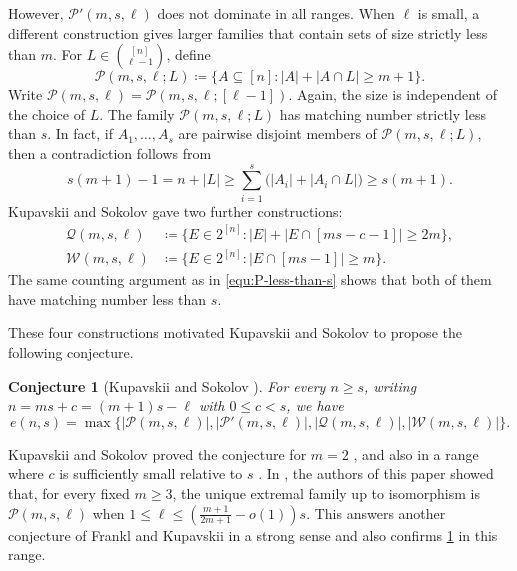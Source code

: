 \documentclass[10pt,a4paper]{article}
\numberwithin{equation}{section}
\newtheorem{conjecture}[conjecture]{Conjecture}
\theoremstyle{definition}
\begin{document}
However, $\mathcal P'(m,s,\ell)$ does not dominate in all ranges.
When $\ell$ is small, a different construction gives larger families that contain sets of size strictly less than $m$.
For $L\in\binom{[n]}{\ell-1}$, define
\[
        \mathcal P(m,s,\ell;L)
        \coloneqq
        \{A\subseteq[n]: |A|+|A\cap L|\ge m+1\}.
\]
Write $\mathcal P(m,s,\ell)=\mathcal P(m,s,\ell;[\ell-1])$.
Again, the size is independent of the choice of $L$.
The family $\mathcal P(m,s,\ell;L)$ has matching number strictly less than $s$.
In fact, if $A_1,\ldots,A_s$ are pairwise disjoint members of $\mathcal P(m,s,\ell;L)$, then a contradiction follows from
\begin{equation}\label{equ:P-less-than-s}
        s(m+1)-1=n+|L|
        \ge
        \sum_{i=1}^s \bigl(|A_i|+|A_i\cap L|\bigr)
        \ge s(m+1).
\end{equation}
Kupavskii and Sokolov gave two further constructions:
\[
        \begin{aligned}
                \mathcal Q(m,s,\ell)
                 & \coloneqq\{E\in 2^{[n]}\colon |E|+|E\cap[ms-c-1]|\ge2m\}, \\
                \mathcal W(m,s,\ell)
                 & \coloneqq\{E\in 2^{[n]}\colon |E\cap [ms-1]|\ge m\}.
        \end{aligned}
\]
The same counting argument as in \eqref{equ:P-less-than-s} shows that both of them have matching number less than $s$.

These four constructions motivated Kupavskii and Sokolov to propose the following conjecture.
\begin{conjecture}[Kupavskii and Sokolov \cite{KupavskiiSokolovOtherEnd}]\label{conj}
        For every $n\ge s$, writing $n=ms+c=(m+1)s-\ell$ with $0\le c<s$, we have
        \[
                e(n,s)=
                \max\{
                |\mathcal P(m,s,\ell)|,
                |\mathcal P'(m,s,\ell)|,
                |\mathcal Q(m,s,\ell)|,
                |\mathcal W(m,s,\ell)|
                \}.
        \]
\end{conjecture}
Kupavskii and Sokolov proved the conjecture for $m=2$ \cite{KupavskiiSokolov2025}, and also in a range where $c$ is sufficiently small relative to $s$ \cite{KupavskiiSokolovOtherEnd}.
In \cite{ChiWangK1}, the authors of this paper showed that, for every fixed $m\ge3$, the unique extremal family up to isomorphism is $\mathcal P(m,s,\ell)$ when $1\le \ell\le (\frac{m+1}{2m+1}-o(1))s$.
This answers another conjecture of Frankl and Kupavskii \cite{FKnonuniform} in a strong sense and also confirms \cref{conj} in this range.
\end{document}
